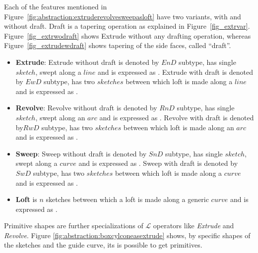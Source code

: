 
Each of the features mentioned in Figure~\ref{fig:abstraction:extruderevolvesweepasloft} have two variants, with and without draft. Draft is a tapering operation as explained in Figure~\ref{fig_extrvar}. Figure~\ref{fig_extrwodraft} shows Extrude without any drafting operation, whereas Figure~\ref{fig_extrudewdraft} shows tapering of the side faces, called ``draft''.

\begin{itemize}[noitemsep,topsep=2pt,parsep=2pt,partopsep=2pt]
\item {\bf Extrude}: Extrude without draft is denoted by $EnD$ subtype, has single $sketch$, swept along a $line$ and is expressed as	
.
Extrude with draft is denoted by $EwD$ subtype, has two $sketches$ between which loft is made along a $line$ and is expressed as 
.
\item {\bf Revolve}: Revolve without draft is denoted by $RnD$ subtype, has single $sketch$, swept along an $arc$ and is expressed as
.		
Revolve with draft is denoted by$ RwD$ subtype, has two $sketches$ between which loft is made along an $arc$ and is expressed as
.	
\item {\bf Sweep}: Sweep without draft is denoted by $SnD$ subtype, has single $sketch$, swept along a $curve$ and is expressed as	
.		
Sweep with draft is denoted by $SwD$ subtype, has two $sketches$ between which loft is made along a $curve$ and is expressed as
.	
\item {\bf Loft} is $n$ sketches between which a loft is made along a generic $curve$ and is expressed as 
. 
\end{itemize}

Primitive shapes are further specializations of {\bf $\mathcal{L}$} operators like {\em Extrude} and {\em Revolve}.  Figure \ref{fig:abstraction:boxcylconeasextrude} shows, by specific shapes of the sketches and the guide curve, its is possible to get primitives.


